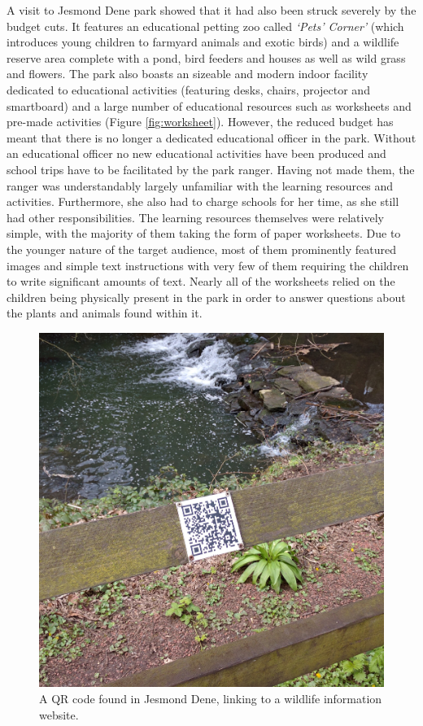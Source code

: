 A visit to Jesmond Dene park showed that it had also been struck severely by the budget cuts. It features an educational petting zoo called \textit{`Pets' Corner'} (which introduces young children to farmyard animals and exotic birds) and a wildlife reserve area complete with a pond, bird feeders and houses as well as wild grass and flowers. The park also boasts an sizeable and modern indoor facility dedicated to educational activities (featuring desks, chairs, projector and smartboard) and a large number of educational resources such as worksheets and pre-made activities (Figure \ref{fig:worksheet}). However, the reduced budget has meant that there is no longer a dedicated educational officer in the park. Without an educational officer no new educational activities have been produced and school trips have to be facilitated by the park ranger. Having not made them, the ranger was understandably largely unfamiliar with the learning resources and activities. Furthermore, she also had to charge schools for her time, as she still had other responsibilities. The learning resources themselves were relatively simple, with the majority of them taking the form of paper worksheets. Due to the younger nature of the target audience, most of them prominently featured images and simple text instructions with very few of them requiring the children to write significant amounts of text. Nearly all of the worksheets relied on the children being physically present in the park in order to answer questions about the plants and animals found within it.

\begin{figure}
  \centering
  \includegraphics[width=0.6\columnwidth]{images/chapter04/jesmondQR.jpg}
  \caption{A QR code found in Jesmond Dene, linking to a wildlife information website.}
  \label{fig:jesmondQR}
\end{figure}

